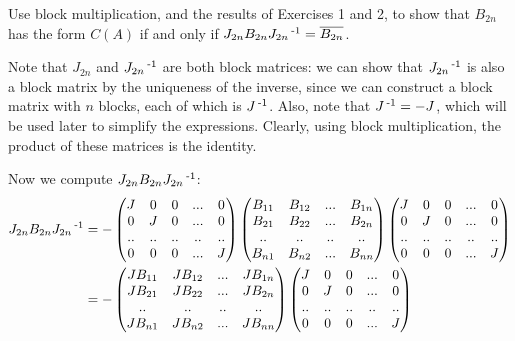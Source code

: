 \documentclass[11pt,onecolumn]{article}
\newcommand{\nn}{_{2n}}
\begin{document}
\begin{exercise}
Use block multiplication, and the results of Exercises 1 and 2, to show that $B\nn$ has the form $C(A)$ if and only if $J\nn B\nn J\nn\inv = \overline{B\nn}$. 

\end{exercise}
\begin{answer}
Note that $J\nn$ and $J\nn\inv$ are both block matrices: we can show that $J\nn\inv$ is also a block matrix by the uniqueness of the inverse, since we can construct a block matrix with $n$ blocks, each of which is $J\operatorname{^{-1}}$. Also, note that $J\operatorname{^{-1}} = -J$, which will be used later to simplify the expressions. Clearly, using block multiplication, the product of these matrices is the identity. 

Now we compute $J\nn B\nn J\nn\inv $:
\begin{align*}
    J\nn B\nn J\nn\inv &= -\begin{pmatrix} J & 0 & 0 & ... & 0 \\ 0 & J & 0 & ... & 0 \\ .. & .. & .. & .. & .. \\ 0 & 0 & 0 & ... & J\end{pmatrix}
    \begin{pmatrix} B_{11} & B_{12} & ... & B_{1n} \\ B_{21}& B_{22} & ... & B_{2n} \\ .. & .. & .. & .. \\ B_{n1} & B_{n2} & ... & B_{nn}\end{pmatrix}
    \begin{pmatrix} J & 0 & 0 & ... & 0 \\ 0 & J & 0 & ... & 0 \\ .. & .. & .. & .. & .. \\ 0 & 0 & 0 & ... & J\end{pmatrix} \\
    &= - \begin{pmatrix} JB_{11} & JB_{12} & ... & JB_{1n} \\ JB_{21}& JB_{22} & ... & JB_{2n} \\ .. & .. & .. & .. \\ JB_{n1} & JB_{n2} & ... & JB_{nn}\end{pmatrix}
    \begin{pmatrix} J & 0 & 0 & ... & 0 \\ 0 & J & 0 & ... & 0 \\ .. & .. & .. & .. & .. \\ 0 & 0 & 0 & ... & J\end{pmatrix} \\

\end{align*}
\end{answer}
\end{document}
